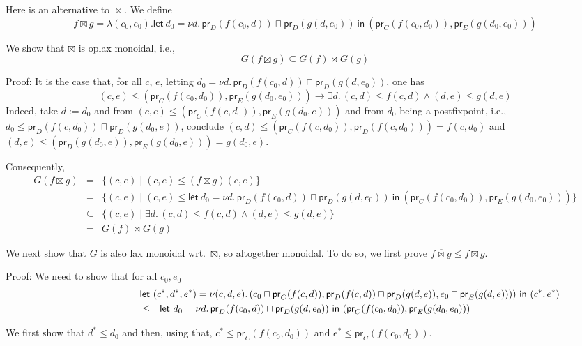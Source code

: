 \documentclass[9pt]{article}
\newcommand{\meet}{\sqcap}
\newcommand{\con}{\wedge}
\newcommand{\imp}{\to}
\newcommand{\prC}{\mathsf{pr}_C}
\newcommand{\prD}{\mathsf{pr}_D}
\newcommand{\prE}{\mathsf{pr}_E}
\newcommand{\bowtielift}{\mathbin{\overline{\bowtie}}}
\begin{document}
\bigskip

Here is an alternative to $\bowtielift$. We define
\[
  f \boxtimes g = \lambda (c_0,e_0).
  \mathsf{let~} d_0 = \nu d.\, \prD(f(c_0,d)) \meet \prD(g(d,e_0))
  \mathsf{~in~} (\prC(f(c_0,d_0)), \prE(g(d_0,e_0)))         
\]  

\bigskip

We show that $\boxtimes$ is oplax monoidal, i.e.,
\[
G (f \boxtimes g) \subseteq G(f) \bowtie G(g)
\]

Proof: It is the case that, for all $c$, $e$, letting
$d_0 = \nu d.\, \prD(f(c_0,d)) \meet \prD(g(d,e_0))$, one has
\[
(c,e) \leq (\prC(f(c_0,d_0)), \prE(g(d_0,e_0))) 
\imp 
\exists d.\, (c,d) \leq f(c,d) \con (d,e) \leq g(d,e)
\]  
Indeed, take $d := d_0$ and from
$(c,e) \leq (\prC(f(c,d_0)), \prE(g(d_0,e)))$ and from $d_0$ being a
postfixpoint, i.e., $d_0 \leq \prD(f(c,d_0)) \meet \prD(g(d_0,e))$,
conclude $(c,d) \leq (\prC(f(c,d_0)),\prD(f(c,d_0))) = f(c,d_0)$ 
and $(d,e) \leq  (\prD(g(d_0,e)),\prE(g(d_0,e))) = g(d_0,e)$.

Consequently,
\begin{eqnarray*}
  G (f \boxtimes g)
  & = & \{ (c,e) \mid (c,e) \leq (f \boxtimes g)(c, e) \} \\
  & = & \{ (c,e) \mid (c,e) \leq \mathsf{let~} d_0 = \nu d.\, \prD(f(c_0,d)) \meet \prD(g(d,e_0))
  \mathsf{~in~} (\prC(f(c_0,d_0)), \prE(g(d_0,e_0))) \} \\
  & \subseteq & \{ (c,e) \mid
               \exists d.\, (c,d) \leq f(c,d) \con (d,e) \leq g(d,e) \} \\
  & = & G(f) \bowtie G(g)              
\end{eqnarray*}


\bigskip

We next show that $G$ is also lax monoidal wrt.\ $\boxtimes$, so
altogether monoidal. To do so, we first prove
$f \bowtielift g \leq f \boxtimes g$.

Proof: We need to show that for all $c_0,e_0$
\begin{eqnarray*}
\lefteqn{
        \mathsf{let~} (c^*,d^*,e^*) = \nu (c,d,e).\, (c_0 \meet \prC(f(c,d)),
  \prD(f(c,d)) \meet \prD(g(d,e)), e_0 \meet \prE(g(d,e)))) \mathsf{~in~} (c^*,e^*) } \\
& \leq &   
  \mathsf{let~} d_0 = \nu d.\, \prD(f(c_0,d)) \meet \prD(g(d,e_0))
  \mathsf{~in~} (\prC(f(c_0,d_0)), \prE(g(d_0,e_0)))  
\end{eqnarray*}

We first show that $d^* \leq d_0$ and then, using that, 
$c^* \leq \prC(f(c_0,d_0))$ and $e^* \leq \prC(f(c_0,d_0))$.
\end{document}
